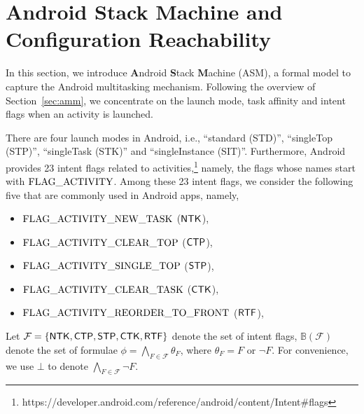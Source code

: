 \documentclass[preprint,12pt]{elsarticle}
\newcommand\ntkflag{{\sf NTK}}
\newcommand\ctpflag{{\sf CTP}}
\newcommand\stpflag{{\sf STP}}
\newcommand\ctkflag{{\sf CTK}}
\newcommand\mtkflag{{\sf MTK}}
\newcommand\rtfflag{{\sf RTF}}
\newcommand\tohflag{{\sf TOH}}
\newcommand{\AMASS}{\textsf{ASM}}
\newcommand\flagset{\mathcal{F}}
\newcommand\bool{\mathbb{B}}
\begin{document}

\section{Android Stack Machine and Configuration Reachability} \label{sec:amass}

%

In this section, we introduce \textbf{A}ndroid \textbf{S}tack \textbf{M}achine (\AMASS), a formal model to capture the Android multitasking mechanism. 
%
Following the overview of Section~\ref{sec:amm}, we concentrate on the launch mode, task affinity and intent flags when an activity is launched.  

There are four launch modes in Android, i.e., ``standard (STD)'', ``singleTop (STP)'', ``singleTask (STK)'' and ``singleInstance (SIT)''. Furthermore, Android provides 23 intent flags related to activities,\footnote{https://developer.android.com/reference/android/content/Intent\#flags}
namely, the flags whose names start with $\rm FLAG\_ACTIVITY$. Among these 23 intent flags, we consider the following five that are commonly used in Android apps, namely,
\begin{itemize}
	\item $\rm FLAG\_ACTIVITY\_NEW\_TASK$ ($\ntkflag$),
	\item $\rm FLAG\_ACTIVITY\_CLEAR\_TOP$ ($\ctpflag$),
	\item $\rm  FLAG\_ACTIVITY\_SINGLE\_TOP$ ($\stpflag$),
	\item $\rm  FLAG\_ACTIVITY\_CLEAR\_TASK$ ($\ctkflag$),
	\item $\rm FLAG\_ACTIVITY\_REORDER\_TO\_FRONT$ ($\rtfflag$),
\end{itemize}

Let $\flagset=\{\ntkflag, \ctpflag, \stpflag, \ctkflag, \rtfflag \}$ denote the set of intent flags, $\bool(\flagset)$ denote the set of formulae $\phi = \bigwedge \limits_{F \in \flagset} \theta_F$, where $\theta_F = F$ or $\neg F$. For convenience, we use $\bot$ to denote $ \bigwedge \limits_{F \in \flagset} \neg F$. 
\end{document}
